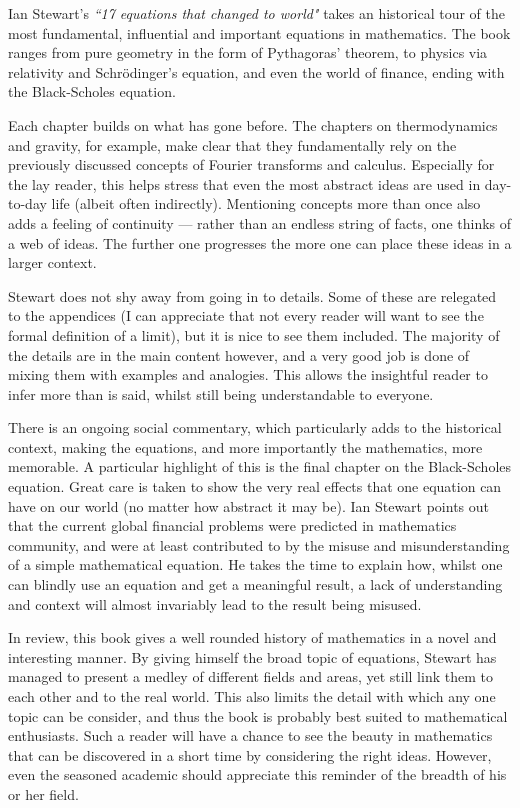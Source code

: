 \documentclass[article,11pt]{memoir}
\begin{document}
Ian Stewart's \emph{``17 equations that changed to world"} takes an historical tour of the most fundamental, influential and important equations in mathematics. The book ranges from pure geometry in the form of Pythagoras' theorem, to physics via relativity and Schr\"odinger's equation, and even the world of finance, ending with the Black-Scholes equation.

Each chapter builds on what has gone before. The chapters on thermodynamics and gravity, for example, make clear that they fundamentally rely on the previously discussed concepts of Fourier transforms and calculus. Especially for the lay reader, this helps stress that even the most abstract ideas are used in day-to-day life (albeit often indirectly). Mentioning concepts more than once also adds a feeling of continuity --- rather than an endless string of facts, one thinks of a web of ideas. The further one progresses the more one can place these ideas in a larger context.

Stewart does not shy away from going in to details. Some of these are relegated to the appendices (I can appreciate that not every reader will want to see the formal definition of a limit), but it is nice to see them included. The majority of the details are in the main content however, and a very good job is done of mixing them with examples and analogies. This allows the insightful reader to infer more than is said, whilst still being understandable to everyone.

There is an ongoing social commentary, which particularly adds to the historical context, making the equations, and more importantly the mathematics, more memorable. A particular highlight of this is the final chapter on the Black-Scholes equation. Great care is taken to show the very real effects that one equation can have on our world (no matter how abstract it may be). Ian Stewart points out that the current global financial problems were predicted in mathematics community, and were at least contributed to by the misuse and misunderstanding of a simple mathematical equation. He takes the time to explain how, whilst one can blindly use an equation and get a meaningful result, a lack of understanding and context will almost invariably lead to the result being misused. 

In review, this book gives a well rounded history of mathematics in a novel and interesting manner. By giving himself the broad topic of equations, Stewart has managed to present a medley of different fields and areas, yet still link them to each other and to the real world. This also limits the detail with which any one topic can be consider, and thus the book is probably best suited to mathematical enthusiasts. Such a reader will have a chance to see the beauty in mathematics that can be discovered in a short time by considering the right ideas. However, even the seasoned academic should appreciate this reminder of the breadth of his or her field.
\end{document}
